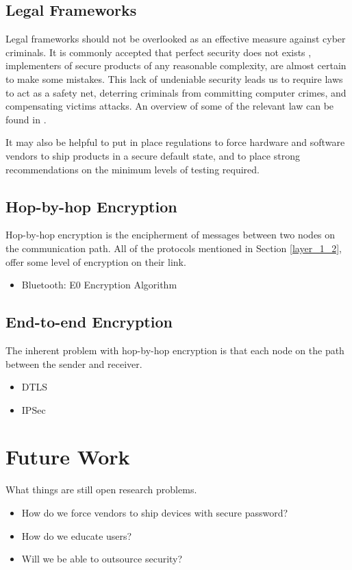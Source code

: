 \documentclass[10pt,journal,compsoc]{IEEEtran}
\begin{document}
\subsection{Legal Frameworks}
Legal frameworks should not be overlooked as an effective measure against cyber
criminals. It is commonly accepted that perfect security does not exists
\cite{ThereMustBeA}, implementers of secure products of any reasonable
complexity, are almost certain to make some mistakes. This lack of undeniable
security leads us to require laws to act as a safety net, deterring criminals
from committing computer crimes, and compensating victims attacks. An overview
of some of the relevant law can be found in \cite{Weber2010}. 

It may also be helpful to put in place regulations to force hardware and
software vendors to ship products in a secure default state, and to place
strong recommendations on the minimum levels of testing required. 

\subsection{Hop-by-hop Encryption}
Hop-by-hop encryption is the encipherment of messages between two nodes on the
communication path. All of the  protocols mentioned in Section \ref{layer_1_2}, offer
some level of encryption on their link. 

\begin{itemize}
\item Bluetooth: E0 Encryption Algorithm
\end{itemize}

\subsection{End-to-end Encryption}
The inherent problem with hop-by-hop encryption is that each node on the path between the sender and receiver.   

\begin{itemize}
\item DTLS
\item IPSec
\end{itemize}


\section{Future Work}
What things are still open research problems. 

\begin{itemize}
\item How do we force vendors to ship devices with secure password?
\item How do we educate users?
\item Will we be able to outsource security?
\end{itemize}
\end{document}
